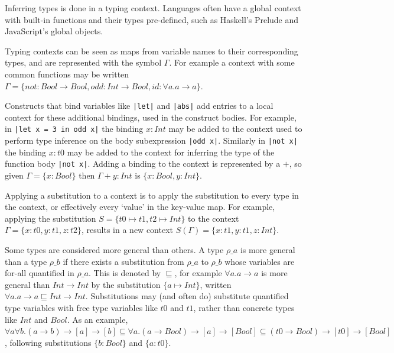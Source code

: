 \documentclass[a4paper,fleqn,12pt]{article}
\begin{document}
Inferring types is done in a typing context. Languages often have a global context with built-in functions and their types pre-defined, such as Haskell’s Prelude and JavaScript’s global objects.

Typing contexts can be seen as maps from variable names to their corresponding types, and are represented with the symbol $\Gamma$. For example a context with some common functions may be written $\Gamma = \{ not: Bool \rightarrow Bool, odd: Int \rightarrow Bool, id: \forall a. a \rightarrow a \}$.

Constructs that bind variables like \texttt{|let|} and \texttt{|abs|} add entries to a local context for these additional bindings, used in the construct bodies. For example, in \texttt{|let x = 3 in odd x|} the binding $x: Int$ may be added to the context used to perform type inference on the body subexpression \texttt{|odd x|}. Similarly in \texttt{|\x \rightarrow not x|} the binding $x: t0$ may be added to the context for inferring the type of the function body \texttt{|not x|}. Adding a binding to the context is represented by a $+$, so given $\Gamma = \{ x: Bool \}$ then $\Gamma + y: Int$ is $\{ x: Bool, y: Int \}$.

Applying a substitution to a context is to apply the substitution to every type in the context, or effectively every ‘value’ in the key-value map. For example, applying the substitution $S = \{ t0 \mapsto t1, t2 \mapsto Int \}$ to the context $\Gamma = \{ x: t0, y: t1, z: t2 \}$, results in a new context $S(\Gamma) = \{ x: t1, y: t1, z: Int \}$.

Some types are considered more general than others. A type $\rho\_a$ is more general than a type $\rho\_b$ if there exists a substitution from $\rho\_a$ to $\rho\_b$ whose variables are for-all quantified in $\rho\_a$. This is denoted by $\sqsubseteq$, for example $\forall a. a \rightarrow a$ is more general than $Int \rightarrow Int$ by the substitution $\{ a \mapsto Int \}$, written $\forall a. a \rightarrow a \sqsubseteq Int \rightarrow Int$. Substitutions may (and often do) substitute quantified type variables with free type variables like $t0$ and $t1$, rather than concrete types like $Int$ and $Bool$. As an example, $\forall a \forall b. (a \rightarrow b) \rightarrow [a] \rightarrow [b] \subseteq \forall a. (a \rightarrow Bool) \rightarrow [a] \rightarrow [Bool] \subseteq (t0 \rightarrow Bool) \rightarrow [t0] \rightarrow [Bool]$, following substitutions $\{ b: Bool \}$ and $\{ a: t0 \}$.
\end{document}

